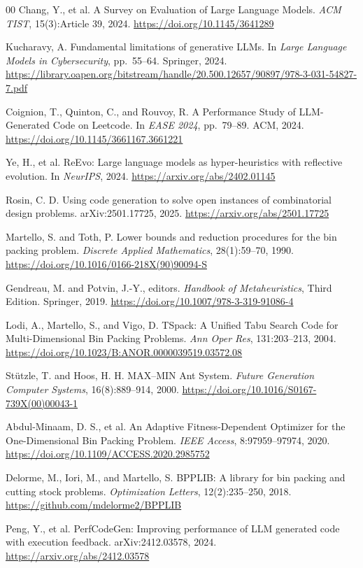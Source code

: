 \documentclass[11pt]{article}
\begin{document}
\begin{thebibliography}{00}
 Chang, Y., et al. A Survey on Evaluation of Large Language Models. \textit{ACM TIST}, 15(3):Article 39, 2024. \url{https://doi.org/10.1145/3641289}

 Kucharavy, A. Fundamental limitations of generative LLMs. In \textit{Large Language Models in Cybersecurity}, pp.~55--64. Springer, 2024. \url{https://library.oapen.org/bitstream/handle/20.500.12657/90897/978-3-031-54827-7.pdf}

 Coignion, T., Quinton, C., and Rouvoy, R. A Performance Study of LLM-Generated Code on Leetcode. In \textit{EASE 2024}, pp.~79--89. ACM, 2024. \url{https://doi.org/10.1145/3661167.3661221}

 Ye, H., et al. ReEvo: Large language models as hyper-heuristics with reflective evolution. In \textit{NeurIPS}, 2024. \url{https://arxiv.org/abs/2402.01145}

 Rosin, C. D. Using code generation to solve open instances of combinatorial design problems. arXiv:2501.17725, 2025. \url{https://arxiv.org/abs/2501.17725}

 Martello, S. and Toth, P. Lower bounds and reduction procedures for the bin packing problem. \textit{Discrete Applied Mathematics}, 28(1):59--70, 1990. \url{https://doi.org/10.1016/0166-218X(90)90094-S}

 Gendreau, M. and Potvin, J.-Y., editors. \textit{Handbook of Metaheuristics}, Third Edition. Springer, 2019. \url{https://doi.org/10.1007/978-3-319-91086-4}

 Lodi, A., Martello, S., and Vigo, D. TSpack: A Unified Tabu Search Code for Multi-Dimensional Bin Packing Problems. \textit{Ann Oper Res}, 131:203--213, 2004. \url{https://doi.org/10.1023/B:ANOR.0000039519.03572.08}

 St{\"u}tzle, T. and Hoos, H. H. MAX--MIN Ant System. \textit{Future Generation Computer Systems}, 16(8):889--914, 2000. \url{https://doi.org/10.1016/S0167-739X(00)00043-1}

 Abdul-Minaam, D. S., et al. An Adaptive Fitness-Dependent Optimizer for the One-Dimensional Bin Packing Problem. \textit{IEEE Access}, 8:97959--97974, 2020. \url{https://doi.org/10.1109/ACCESS.2020.2985752}

 Delorme, M., Iori, M., and Martello, S. BPPLIB: A library for bin packing and cutting stock problems. \textit{Optimization Letters}, 12(2):235--250, 2018. \url{https://github.com/mdelorme2/BPPLIB}

 Peng, Y., et al. PerfCodeGen: Improving performance of LLM generated code with execution feedback. arXiv:2412.03578, 2024. \url{https://arxiv.org/abs/2412.03578}

\end{thebibliography}
\end{document}
